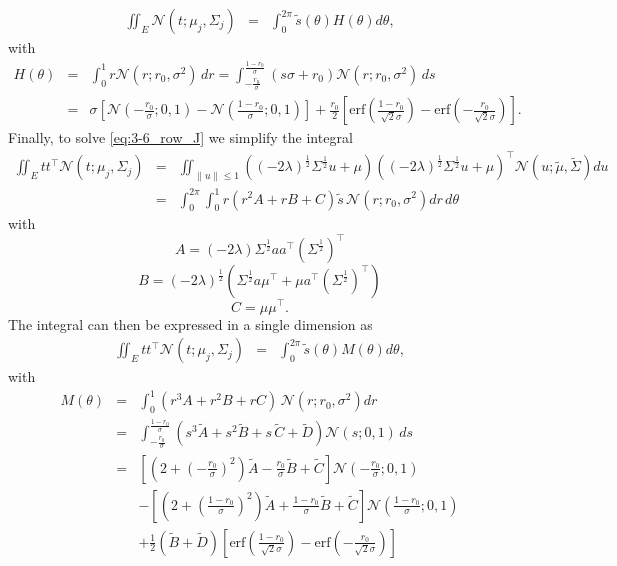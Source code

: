 \documentclass{article}
\begin{document}
\begin{eqnarray}
\iint_{E} \mathcal{N}(t; \mu_j, \Sigma_j) &=& \int_{0}^{2\pi} \tilde{s}(\theta) H(\theta)d\theta,
\end{eqnarray}with
\begin{eqnarray}
 H(\theta) &=& \int_{0}^1 
r\mathcal{N}(r; r_0, \sigma^2) \, dr \nonumber = \int_{-\frac{r_0}{\sigma}}^{\frac{1-r_0}{\sigma}}
(s\sigma+r_0)  \mathcal{N}(r; r_0, \sigma^2) \, ds \\
&=&
\sigma\left[\mathcal{N}\left(-\frac{r_0}{\sigma};0,1\right)
-\mathcal{N}\left(\frac{1-r_0}{\sigma};0,1\right)\right] \nonumber +\frac{r_0}{2}\left[ \mathrm{erf}\left(\frac{1-r_0}{\sqrt{2}\sigma}\right)- \mathrm{erf}\left(-\frac{r_0}{\sqrt{2}\sigma}\right)\right].
\end{eqnarray}
Finally, to solve \eqref{eq:3-6_row_J} we simplify the integral
\begin{eqnarray}
    \iint_{E} tt^\top\mathcal{N}(t; \mu_j, \Sigma_j)&=&\iint_{\|u\|\le 1} \left((-2\lambda)^{\frac{1}{2}} \Sigma^{\frac{1}{2}}u+\mu\right)\left((-2\lambda)^{\frac{1}{2}} \Sigma^{\frac{1}{2}}u+\mu\right)^\top \mathcal{N}(u; \tilde{\mu}, \tilde{\Sigma}) du \nonumber \\
    &=&\int_{0}^{2\pi} \int_{0}^1 
 r(r^2A+rB+C)\tilde{s} \, \mathcal{N}(r; r_0, \sigma^2) dr \, d\theta
\end{eqnarray}
with
\begin{equation}
    A=(-2\lambda)\Sigma^{\frac{1}{2}}aa^\top(\Sigma^{\frac{1}{2}})^\top
\end{equation}
\begin{equation}
    B=(-2\lambda)^{\frac{1}{2}}\left( \Sigma^{\frac{1}{2}}a\mu^\top+\mu a^\top (\Sigma^{\frac{1}{2}})^\top \right)
\end{equation}
\begin{equation}
    C=\mu\mu^\top.
\end{equation}
The integral can then be expressed in a single dimension as 
\begin{eqnarray}
\iint_{E} tt^\top \mathcal{N}(t; \mu_j, \Sigma_j) &=& \int_{0}^{2\pi} \tilde{s}(\theta) M(\theta)d\theta,
\end{eqnarray}
with
\begin{eqnarray}
M(\theta) &=& \int_{0}^1 
(r^3A+r^2B+rC)\, \mathcal{N}(r; r_0, \sigma^2) dr \nonumber\\
&=& \int_{-\frac{r_0}{\sigma}}^{\frac{1-r_0}{\sigma}}
(s^3\tilde{A}+s^2\tilde{B}+s\,\tilde{C}+\tilde{D})  \mathcal{N}(s; 0, 1) \, ds \nonumber\\
&=& \left[\left(2+\left(-\frac{r_0}{\sigma}\right)^2\right)\tilde{A}-\frac{r_0}{\sigma}\tilde{B}+\tilde{C}\right]\mathcal{N}\left(-\frac{r_0}{\sigma};0,1\right)\nonumber\\
&&-\left[\left(2+\left(\frac{1-r_0}{\sigma}\right)^2\right)\tilde{A}+\frac{1-r_0}{\sigma}\tilde{B}+\tilde{C}\right]\mathcal{N}\left(\frac{1-r_0}{\sigma};0,1\right) \nonumber\\
&&+\frac{1}{2}\left(\tilde{B}+\tilde{D}\right)\left[ \mathrm{erf}\left(\frac{1-r_0}{\sqrt{2}\sigma}\right)- \mathrm{erf}\left(-\frac{r_0}{\sqrt{2}\sigma}\right)\right]
\end{eqnarray}
\end{document}
